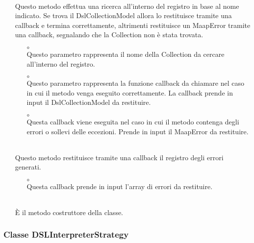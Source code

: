 \begin{itemize}
\begin{itemize}
\end{itemize}
\item[]  \\ Questo metodo effettua una ricerca all'interno del registro in base al nome indicato. Se trova il DslCollectionModel allora lo restituisce tramite una callback e termina correttamente, altrimenti restituisce un MaapError tramite una callback, segnalando che la Collection non è stata trovata.
\begin{itemize}\addtolength{\itemsep}{-0.5\baselineskip}
\item[$\circ$]  \\ Questo parametro rappresenta il nome della Collection da cercare all'interno del registro.
\item[$\circ$]  \\ Questo parametro rappresenta la funzione callback da chiamare nel caso in cui il metodo venga eseguito correttamente. La callback prende in input il DslCollectionModel da restituire.
\item[$\circ$]  \\ Questa callback viene eseguita nel caso in cui il metodo contenga degli errori o sollevi delle eccezioni. Prende in input il MaapError da restituire.
\end{itemize}
\item[]  \\ Questo metodo restituisce tramite una callback il registro degli errori generati.
\begin{itemize}\addtolength{\itemsep}{-0.5\baselineskip}
\item[$\circ$]  \\ Questa callback prende in input l'array di errori da restituire.
\end{itemize}
\item[]  \\ È il metodo costruttore della classe.
\end{itemize}

\subsubsection{Classe DSLInterpreterStrategy}

